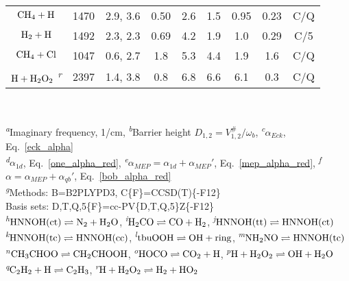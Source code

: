 \documentclass[journal=jpcafh,manuscript=article]{achemso}
\begin{document}
\begin{table}[ht]
\begin{tabular}{|ccccccccc|}
  \\
  $\rm CH_4+H$
  & 1470  & 2.9, 3.6  & 0.50 & 2.6  & 1.5 & 0.95 & 0.23  & C/Q
  \\
  $\rm H_2+H$
  & 1492  & 2.3, 2.3  & 0.69 & 4.2  & 1.9 & 1.0 & 0.29  & C/5
  \\
  $\rm CH_4+Cl$
  & 1047  & 0.6, 2.7 & 1.8 & 5.3  & 4.4 & 1.9 & 1.6  & C/Q
  \\
  $\rm H+H_2O_2$ \textsuperscript{\emph{r}}
  & 2397  & 1.4, 3.8 & 0.8 & 6.8  & 6.6 & 6.1 & 0.3  & C/Q
  \\ \hline
\end{tabular}\\
\begin{flushleft}
  \textsuperscript{\emph{a}}Imaginary frequency, 1/cm,
  \textsuperscript{\emph{b}}Barrier height $D_{1,2}=V^\#_{1,2}/\omega_b$,
  \textsuperscript{\emph{c}}$\alpha_{Eck}$, Eq.~\ref{eck_alpha}\\
  \textsuperscript{\emph{d}}$\alpha_{1d}$, Eq.~\ref{one_alpha_red},
  \textsuperscript{\emph{e}}$\alpha_{MEP}=\alpha_{1d}+\alpha_{MEP}'$, Eq.~\ref{mep_alpha_red},
  \textsuperscript{\emph{f}}$\alpha=\alpha_{MEP}+\alpha_{qb}'$,  Eq.~\ref{bob_alpha_red}\\
  \textsuperscript{\emph{g}}Methods: B=B2PLYPD3, C\{F\}=CCSD(T)\{-F12\}\\
  \makebox[0.1in]{}Basis sets: D,T,Q,5\{F\}=cc-PV\{D,T,Q,5\}Z\{-F12\}\\
  \textsuperscript{\emph{h}}$\rm HNNOH(ct)\rightleftharpoons N_2+H_2O$,
  \textsuperscript{\emph{i}}$\rm H_2CO\rightleftharpoons CO+H_2$,
  \textsuperscript{\emph{j}}$\rm HNNOH(tt)\rightleftharpoons HNNOH(ct)$\\
  \textsuperscript{\emph{k}}$\rm HNNOH(tc)\rightleftharpoons HNNOH(cc)$,
  \textsuperscript{\emph{l}}$\rm tbuOOH\rightleftharpoons OH+ring$,
  \textsuperscript{\emph{m}}$\rm NH_2NO\rightleftharpoons HNNOH(tc)$\\
  \textsuperscript{\emph{n}}$\rm CH_3CHOO\rightleftharpoons CH_2CHOOH$,
  \textsuperscript{\emph{o}}$\rm HOCO\rightleftharpoons CO_2+H$,
  \textsuperscript{\emph{p}}$\rm H+H_2O_2\rightleftharpoons OH+H_2O$\\
  \textsuperscript{\emph{q}}$\rm C_2H_2+H\rightleftharpoons C_2H_3$,
  \textsuperscript{\emph{r}}$\rm H+H_2O_2\rightleftharpoons H_2+HO_2$
\end{flushleft}
\label{tun_tab}
\end{table}
\end{document}
